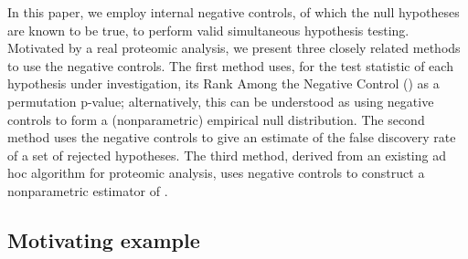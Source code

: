 \documentclass[a4paper,11pt]{article}
\theoremstyle{plain}
\theoremstyle{definition}
\theoremstyle{plain}
\newcommand{\nickname}{{\text{RANC}}}
\newcommand{\localFDR}{\text{local-FDR}}
\begin{document}
In this paper, we employ internal negative controls, of which the null
hypotheses are known to be true, to perform valid simultaneous
hypothesis testing. Motivated by a real proteomic analysis, we present
three closely related methods to use the negative controls. The first
method uses, for the test statistic of each
hypothesis under investigation, its Rank Among the Negative Control
(\nickname) as a permutation p-value; alternatively, this can be
understood as using negative controls to form a (nonparametric)
empirical null distribution. The second method uses the negative
controls to give an estimate of the false discovery rate of a set of
rejected hypotheses. The third method, derived from an existing
ad hoc algorithm for proteomic analysis, uses negative controls to
construct a nonparametric estimator of \localFDR.



\subsection{Motivating example}\label{sec:motivating.data}
\end{document}
